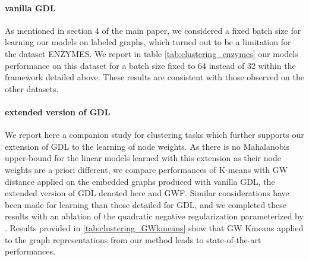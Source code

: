 \documentclass{article}
\begin{document}
	\paragraph{vanilla GDL} As mentioned in section 4 of the main paper, we considered a fixed batch size for learning our models on labeled graphs, which turned out to be a limitation for the dataset ENZYMES. We report in table \ref{tab:clustering_enzymes} our models performance on this dataset for a batch size fixed to 64 instead of 32 within the framework detailed above. These results are consistent with those observed on the other datasets.
	\begin{table*}[h!]
		\vspace*{-5mm}
		\caption{Clustering : dataset ENZYMES}
		\label{tab:clustering_enzymes}
		\begin{center}
		\end{center}
	\end{table*}
	
	\vspace*{-5mm}
	\paragraph{extended version of GDL} We report here a companion study for clustering tasks which further supports our extension of GDL to the learning of node weights. As there is no Mahalanobis upper-bound for the linear models learned with this extension as their node weights are a priori different, we compare performances of K-means with GW distance applied on the embedded graphs produced with vanilla GDL, the extended version of GDL denoted here  and GWF. Similar considerations have been made for learning  than those detailed for GDL, and we completed these results with an ablation of the quadratic negative regularization parameterized by . Results provided in \ref{tab:clustering_GWkmeans} show that GW Kmeans applied to the graph representations from our method  leads to state-of-the-art performances.
	
\end{document}

